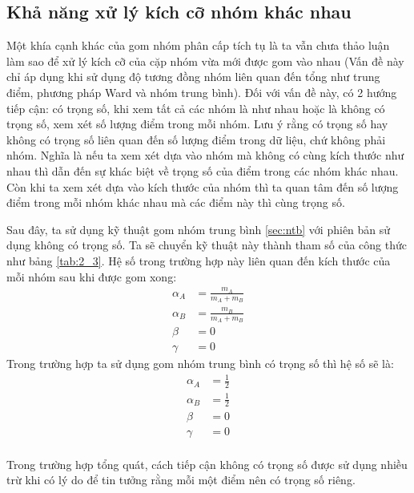 \subsection{Khả năng xử lý kích cỡ nhóm khác nhau}
Một khía cạnh khác của gom nhóm phân cấp tích tụ là ta vẫn chưa thảo luận làm sao để xử lý kích cỡ của cặp nhóm vừa mới được gom vào nhau (Vấn đề này chỉ áp dụng khi sử dụng độ tương đồng nhóm liên quan đến tổng như trung điểm, phương pháp Ward và nhóm trung bình).
Đối với vấn đề này, có 2 hướng tiếp cận: có trọng số, khi xem tất cả các nhóm là như nhau hoặc là không có trọng số, xem xét số lượng điểm trong mỗi nhóm.
Lưu ý rằng có trọng số hay không có trọng số liên quan đến số lượng điểm trong dữ liệu, chứ không phải nhóm.
Nghĩa là nếu ta xem xét dựa vào nhóm mà không có cùng kích thước như nhau thì dẫn đến sự khác biệt về trọng số của điểm trong các nhóm khác nhau.
Còn khi ta xem xét dựa vào kích thước của nhóm thì ta quan tâm đến số lượng điểm trong mỗi nhóm khác nhau mà các điểm này thì cùng trọng số.

Sau đây, ta sử dụng kỹ thuật gom nhóm trung bình \ref{sec:ntb} với phiên bản sử dụng không có trọng số.
Ta sẽ chuyển kỹ thuật này thành tham số của công thức như bảng \ref{tab:2_3}.
Hệ số trong trường hợp này liên quan đến kích thước của mỗi nhóm sau khi được gom xong:
\begin{equation}
\begin{aligned}
\alpha_A &= \frac{m_A}{m_A + m_B}	\\
\alpha_B &= \frac{m_B}{m_A + m_B}	\\
\beta &= 0		\\
\gamma &= 0
\end{aligned}
\end{equation}
Trong trường hợp ta sử dụng gom nhóm trung bình có trọng số thì hệ số sẽ là:
\begin{equation}
\begin{aligned}
\alpha_A &= \frac{1}{2} \\
\alpha_B &= \frac{1}{2} \\
\beta &= 0		\\
\gamma &= 0		\\
\end{aligned}
\end{equation}

Trong trường hợp tổng quát, cách tiếp cận không có trọng số được sử dụng nhiều trừ khi có lý do để tin tưởng rằng mỗi một điểm nên có trọng số riêng.

